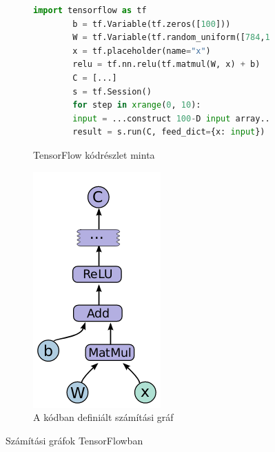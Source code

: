 \begin{figure}[h]
	\begin{subfigure}{0.7\textwidth}
		\begin{lstlisting}[language=Python]
		import tensorflow as tf
		b = tf.Variable(tf.zeros([100]))
		W = tf.Variable(tf.random_uniform([784,100],-1,1))
		x = tf.placeholder(name="x")
		relu = tf.nn.relu(tf.matmul(W, x) + b)
		C = [...]
		s = tf.Session()
		for step in xrange(0, 10):
		input = ...construct 100-D input array...
		result = s.run(C, feed_dict={x: input})
		\end{lstlisting}\label{lst:TF}
		\caption{TensorFlow kódrészlet minta}
	\end{subfigure}
	\begin{subfigure}{0.25\textwidth}
		\centering
		\includegraphics[width=0.9\columnwidth]{fig/TF_CompGraph}
		\caption{A kódban definiált számítási gráf}
		\label{fig:tfcompgraph}
	\end{subfigure}
	\caption{Számítási gráfok TensorFlowban\cite{tensorflow2015-whitepaper}}
\end{figure}

